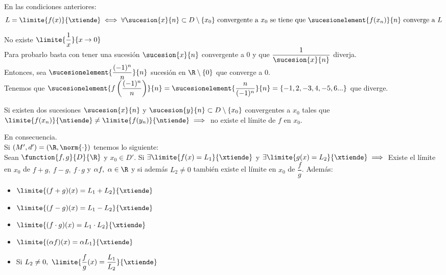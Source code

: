 	\begin{proposicion} En las condiciones anteriores:\\
	\[L=\limite{f(x)}{\xtiende}\iff \forall \sucesion{x}{n}\subset D\setminus\{x_0\}\mathrm{\ convergente\ a\ }x_0\mathrm{\ se\ tiene\ que\ }\sucesionelement{f(x_n)}{n}\mathrm{\ converge\ a\ } L\]	
	\begin{ejem} No existe $\limite{\dfrac{1}{x}}{x\rightarrow 0}$\\
	Para probarlo basta con tener una sucesión $\sucesion{x}{n}$ convergente a 0  y que $\dfrac{1}{\sucesion{x}{n}}$ diverja.\\
	Entonces, sea $\sucesionelement{\dfrac{(-1)^n}{n}}{n}$ sucesión en $\R\setminus\{0\}$ que converge a 0.\\ Tenemos que $\sucesionelement{f\left(\dfrac{(-1)^n}{n}\right)}{n}=\sucesionelement{\dfrac{n}{(-1)^n}}{n} = \{-1,2,-3,4,-5,6...\}$ que diverge.
	\end{ejem}	
	\end{proposicion}
	
	\begin{proposicion}Si existen dos sucesiones $\sucesion{x}{n}$ y $\sucesion{y}{n}\subset D\setminus\{x_0\}$ convergentes a $x_0$ tales que $\limite{f(x_n)}{\ntiende}\neq\limite{f(y_n)}{\ntiende}\implies$ no existe el límite de $f$ en $x_0$.
	\end{proposicion}
	
	\begin{corolario} En consecuencia.\\
		Si $(M',d')=(\R,\norm{\cdot})$ tenemos lo siguiente:\\
		Sean $\function{f,g}{D}{\R}$ y $x_0\in D'$. Si $\exists\limite{f(x)=L_1}{\xtiende}$ y $\exists\limite{g(x)=L_2}{\xtiende}\implies$ Existe el límite en $x_0$ de $f+g,\ f-g,\ f\cdot g$ y $\alpha f,\ \alpha\in\R$ y si además $L_2\neq 0$ también existe el límite en $x_0$ de $\dfrac{f}{g}$. Además:\\
		\begin{itemize}
		\item $\limite{(f+g)(x)=L_1+L_2}{\xtiende}$
		\item $\limite{(f-g)(x)=L_1-L_2}{\xtiende}$
		\item $\limite{(f\cdot g)(x)=L_1\cdot L_2}{\xtiende}$
		\item $\limite{(\alpha f)(x)=\alpha L_1}{\xtiende}$
		\item Si $L_2\neq 0,\ \limite{\dfrac{f}{g}(x)=\dfrac{L_1}{L_2}}{\xtiende}$
		\end{itemize}
	\end{corolario}
	
